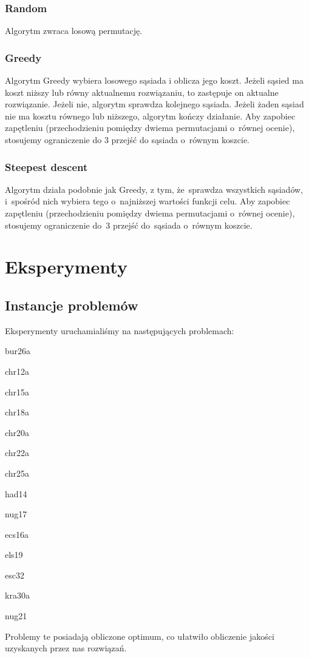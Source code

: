 \documentclass[a4paper,10pt]{article}
\begin{document}
\subsubsection{Random}
Algorytm zwraca losową permutację.

\subsubsection{Greedy}
Algorytm Greedy wybiera losowego sąsiada i oblicza jego koszt.
Jeżeli sąsied ma koszt niższy lub równy aktualnemu rozwiązaniu, to zastępuje on aktualne rozwiązanie.
Jeżeli nie, algorytm sprawdza kolejnego sąsiada.
Jeżeli żaden sąsiad nie ma kosztu równego lub niższego, algorytm kończy działanie.
Aby zapobiec zapętleniu (przechodzieniu pomiędzy dwiema permutacjami o~równej ocenie), stosujemy ograniczenie do 3 przejść do sąsiada o~równym koszcie.

\subsubsection{Steepest descent}
Algorytm działa podobnie jak Greedy, z tym, że~sprawdza wszystkich sąsiadów, i~spośród nich wybiera tego
o~najniższej wartości funkcji celu.
Aby zapobiec zapętleniu (przechodzieniu pomiędzy dwiema permutacjami o~równej ocenie),
stosujemy ograniczenie do~3 przejść do~sąsiada o~równym koszcie.

\section{Eksperymenty}
\subsection{Instancje problemów}
Eksperymenty uruchamialiśmy na następujących problemach:
\begin{tightenum}
\item bur26a
\item chr12a
\item chr15a
\item chr18a
\item chr20a
\item chr22a
\item chr25a
\item had14
\item nug17
\item ecs16a
\item els19
\item esc32
\item kra30a
\item nug21
\end{tightenum}
Problemy te posiadają obliczone optimum, co ułatwiło obliczenie jakości uzyskanych przez nas rozwiązań.
\end{document}
